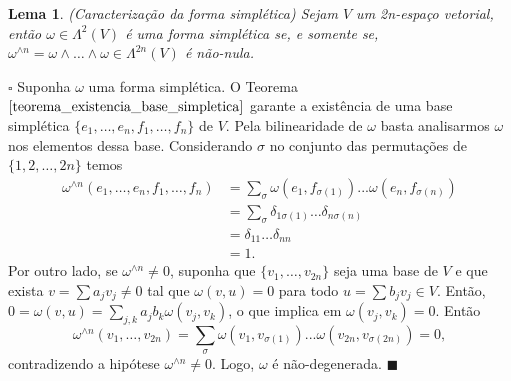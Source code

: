 \documentclass[12pt]{book}
\newtheorem{lema}[teorema]{Lema}
\newenvironment{prova}[1]{$\square$ #1}{\hfill$\blacksquare$}
\begin{document}
	\begin{lema}\label{lema_caracterizacao_forma_simpetica}
		(Caracterização da forma simplética) Sejam $V$ um 2n-espaço vetorial, então $\omega \in \Lambda^{2}(V)$ é uma forma simplética se, e somente se, $\omega^{\wedge n} = \omega\wedge \dots \wedge \omega \in \Lambda^{2n}(V)$ é não-nula.
	\end{lema}
	\begin{prova}
		Suponha $\omega$ uma forma simplética. O Teorema $\ref{teorema_existencia_base_simpletica}$ garante a existência de uma base simplética $\{e_{1}, \dots, e_{n}, f_{1}, \dots, f_{n}\}$ de $V$. Pela bilinearidade de $\omega$ basta analisarmos $\omega$ nos elementos dessa base. Considerando $\sigma$ no conjunto das permutações de $\{1, 2, \dots , 2n\}$ temos
		$$		
		\begin{aligned}
		\omega^{\wedge n}(e_{1}, \dots, e_{n}, f_{1}, \dots, f_{n}) &=\sum_{\sigma} \omega(e_{1}, f_{\sigma(1)})...\omega(e_{n}, f_{\sigma(n)})
		\\
		&= \sum_{\sigma}\delta_{1\sigma(1)}\dots\delta_{n\sigma(n)}
		\\
		&= \delta_{11}\dots\delta_{nn}
		\\
		&= 1.
		\end{aligned}
		$$
		Por outro lado, se $\omega^{\wedge n} \neq 0$, suponha que $\{v_{1},\dots, v_{2n}\}$ seja uma base de $V$ e que exista $v =\sum a_{j}v_{j} \neq 0$ tal que $\omega(v, u) = 0$ para todo $u=\sum b_{j}v_{j}  \in V$. Então, $0=\omega(v, u ) = \sum_{j, k} a_{j}b_{k}\omega(v_{j}, v_{k})$, o que implica em $\omega(v_{j}, v_{k}) =0$. Então 
		$$
		\omega^{\wedge n}(v_{1},\dots, v_{2n}) = \sum_{\sigma} \omega(v_{1}, v_{\sigma(1)})...\omega(v_{2n}, v_{\sigma(2n)})=0,
		$$
		contradizendo a hipótese $\omega^{\wedge n} \neq 0$. Logo, $\omega$ é não-degenerada.
	\end{prova}
	
\end{document}
